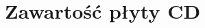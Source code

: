 \documentclass[../praca.tex]{subfiles}
\begin{document}
\appendix
\chapter{Zawartość płyty CD}
\end{document}

